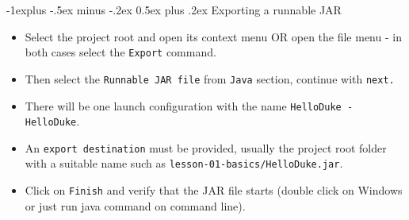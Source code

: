 \documentclass[10pt,landscape,a4paper]{article}
\makeatletter
\renewcommand{\subsection}{\@startsection{subsection}{2}{0mm}%
                                {-1explus -.5ex minus -.2ex}%
                                {0.5ex plus .2ex}%
                                {\normalfont\normalsize\bfseries}}
\makeatother
\begin{document}
\begin{multicols}{2}
\subsection{Exporting a runnable JAR}
\begin{itemize}
\item Select the project root and open its context menu OR open the file menu - in both cases select the \texttt{Export} command.
\item Then select the \texttt{Runnable JAR file} from \texttt{Java} section, continue with \texttt{next.}
\item There will be one launch configuration with the name \texttt{HelloDuke - HelloDuke}.
\item An \texttt{export destination} must be provided, usually the project root folder with a suitable name such as \texttt{lesson-01-basics/HelloDuke.jar}.
\item Click on \texttt{Finish} and verify that the JAR file starts (double click on Windows or just run java command on command line).
\end{itemize}
\end{multicols}
\end{document}
